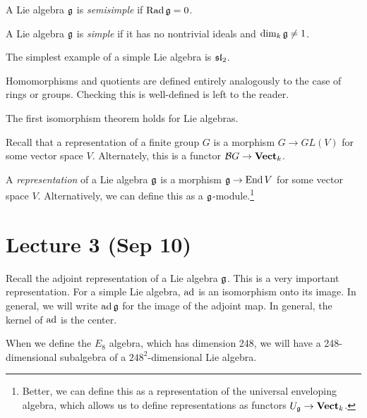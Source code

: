 \documentclass[twoside, 10pt]{article}
\begin{document}
    \begin{defn}
        A Lie algebra $\mathfrak{g}$ is \textit{semisimple} if $\operatorname{Rad} \mathfrak{g} = 0$.
    \end{defn}

    \begin{defn}
        A Lie algebra $\mathfrak{g}$ is \textit{simple} if it has no nontrivial ideals and $\dim_k \mathfrak{g} \neq 1$.
    \end{defn}

    \begin{exm}
        The simplest example of a simple Lie algebra is $\mathfrak{sl}_2$.
    \end{exm}

    Homomorphisms and quotients are defined entirely analogously to the case of rings or groups. Checking this is well-defined is left to the reader.

    \begin{rmk}
        The first isomorphism theorem holds for Lie algebras.
    \end{rmk}

    Recall that a representation of a finite group $G$ is a morphism $G \to GL(V)$ for some vector space $V$. Alternately, this is a functor $\mathcal{B}G \to \mathbf{Vect}_k$.

    \begin{defn}
        A \textit{representation} of a Lie algebra $\mathfrak{g}$ is a morphism $\mathfrak{g} \to \operatorname{End}{V}$ for some vector space $V$. Alternatively, we can define this as a $\mathfrak{g}$-module.\footnote{Better, we can define this as a representation of the universal enveloping algebra, which allows us to define representations as functors $U_{\mathfrak{g}} \to \mathbf{Vect}_k$.}
    \end{defn}

    \section{Lecture 3 (Sep 10)}%
    \label{sec:lecture_3_sep_10_}

    Recall the adjoint representation of a Lie algebra $\mathfrak{g}$. This is a very important representation. For a simple Lie algebra, $\operatorname{ad}$ is an isomorphism onto its image. In general, we will write $\operatorname{ad} \mathfrak{g}$ for the image of the adjoint map. In general, the kernel of $\operatorname{ad}$ is the center. 

    \begin{rmk}
        When we define the $E_8$ algebra, which has dimension 248, we will have a 248-dimensional subalgebra of a $248^2$-dimensional Lie algebra.
    \end{rmk}
\end{document}

